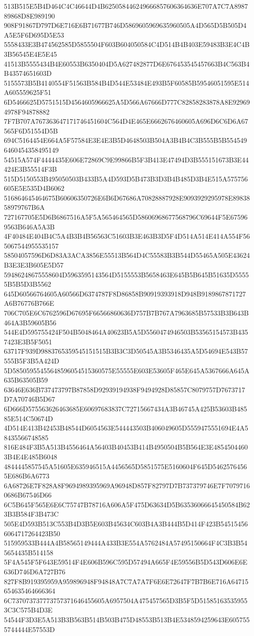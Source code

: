 {{{{{{{{{{{{{{{{{{{{{513B515E5B4D464C4C46644D4B625058446249666857606364636E707A7C7A898789868D8E989190
908F91867D797D6E716E6B71677B746D5869605969635960505A4D565D5B505D4A5E5F6D695D5E53
5558433E3B474562585D5855504F603B604050584C4D514B4B403E59483B3E4C4B3B56545E4E5E45
41513B5555434B4E60553B6350404D5A627482877D6E676453545457663B4C563B4B43574651603D
5155573B5B4140554F51563B584B4D544E53484E493B5F60585B59546051595E514A605559625F51
6D5466625D5751515D4564605966625A5D566A67666D777C82858283878A8E929694978F94878882
7F7B707A767363647171746451604C564D4E465E6662676460605A696D6C6D6A67565F6D51554D5B
694C5164454E664A5F57584E3E4E3B5D4648503B504A3B4B4C3B555B5B5545496460454358495149
54515A574F4444435E606E72869C9E99866B5F3B413E47494D3B555151673B3E44424E3B55514F3B
515D5150553B495050503B433B5A4D593D5B473B3D3B4B485D3B4E515A575756605E5E535D4B6062
516864645464675B60606350726E6B6D67686A70828887928E9093929295978E8983858979767B6A
727167705E5D6B6867516A5F5A565464565D58606968677568796C69644F5E675969563B646A5A3B
4F40484E404B4C5A4B3B4B56563C51603B3E463B3D5F4D514A514E414A554F565067544955535157
58504057596D6D83A3ACA3856E55513B564D4C55583B3B544D55465A505E43624B3E3E3B605E5D57
59486248675558604D5963595143564D5155553B5658463E645B5B645B51635D55555B5B5D3B5562
645D60566764605A60566D6374787F8D86858B90919393918D948B9189867871727A6B76776B766E
706C705E6C6762596D67695F66566860636D757B7B767A7963685B57533B3B643B464A3B59605B56
544E4D595755424F504B5048464A40623B5A5D5560474946503B53565154573B4357423E3B5F5051
63717F939D9883765359545151515B3B3C3D50545A3B5346435A5D54694E543B57555B5F3B5A424D
5D58505955455648596054515360575E55555E603E53605F465E645A5367666A645A635B63505B59
63646E636B737473797B87858D92939194938F9494928D85857C8079757D7673717D7A70746B5D67
6D666D575563626463685E60697683837C72715667434A3B46745A425B53603B48585E514C50674D
4D514E413B42453B48544D6054563E544443503B406049605D5559475551694E4A58435566748585
816E484F3B5A513B4556464A56403B40453B414B4950504B5B564E3E48545044603B4E4E485B6048
4844445857545A51605E635946515A4456565D5851575E5160604F645D54625764565E686B6A6773
6A68726E7F828A8F9694989395969A96948D857F82797D7B737379746E7F70797160686B67546D66
6C5B645F565E6E6C75747B78716A606A5F475D63634D5B63536066645450584B623B3B584F3B473C
505E4D593B513C553B4D3B5E603B45634C603B4A3B444B5D414F423B545154566064717264423B50
515959533B444A4B58565149444A433B3E554A5762484A57495150664F4C3B3B545654435B514158
5F4A545F5F643E59514F4E606B596C595D57494A665F4E59556B5D543D606E6E636D746D6A727B76
827F8B919395959A959896948F94848A7C7A7A7F6E6E72647F7B7B6E716A64715654635464666364
6C737073737773757371646455605A6957504A475457565D3B5F5D515851635359553C3C575B4D3E
54544F3D3E5A513B3B563B514B503B475D48553B513B4E5348594259643E6057555744444E57553D
}}}}}}}}}}}}}}}}}}}}}
